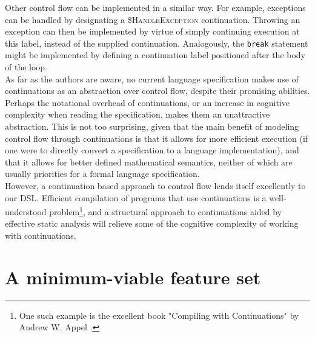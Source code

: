 Other control flow can be implemented in a similar way. For example, exceptions can be handled by designating a \textsc{\$HandleException} continuation. Throwing an exception can then be implemented by virtue of simply continuing execution at this label, instead of the supplied continuation. Analogously, the \texttt{break} statement might be implemented by defining a continuation label positioned after the body of the loop.\\

As far as the authors are aware, no current language specification makes use of continuations as an abstraction over control flow, despite their promising abilities. Perhaps the notational overhead of continuations, or an increase in cognitive complexity when reading the specification, makes them an unattractive abstraction. This is not too surprising, given that the main benefit of modeling control flow through continuations is that it allows for more efficient execution (if one were to directly convert a specification to a language implementation), and that it allows for better defined mathematical semantics, neither of which are usually priorities for a formal language specification. \\

However, a continuation based approach to control flow lends itself excellently to our \ac{DSL}. Efficient compilation of programs that use continuations is a well-understood problem\footnote{One such example is the excellent book "Compiling with Continuations" by Andrew W. Appel \cite{Appel1992}.}, and a structural approach to continuations aided by effective static analysis will relieve some of the cognitive complexity of working with continuations.


\section{A minimum-viable feature set}
\label{sec:design_features}

